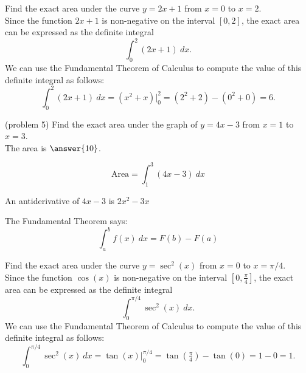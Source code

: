 \documentclass[handout]{ximera}
\begin{document}
\begin{example}[example 5]
Find the exact area under the curve $y = 2x+1$ from $x=0$ to $x= 2$.\\
Since the function $2x+1$ is non-negative on the interval $[0, 2]$, the exact area can be expressed as the definite integral
\[\int_0^2 (2x+1) \ dx.\]
We can use the Fundamental Theorem of Calculus to compute the value of this definite integral as follows:
\[
\int_0^2 (2x+ 1) \ dx = (x^2 + x) \Big|_0^2 = (2^2 + 2) - (0^2 + 0) = 6.
\]



\end{example}


\begin{problem}(problem 5)
Find the exact area under the graph of $y = 4x-3$ from $x = 1$ to $x = 3$.\\
The area is $\answer{10}$.
 \begin{hint}
  \[
  \text{Area} =  \int_1^3 (4x - 3) \ dx
  \]
 \end{hint}
    \begin{hint}
      An antiderivative of $4x-3$ is $2x^2 - 3x$
    \end{hint}
    \begin{hint}
      The Fundamental Theorem says:
      \[
      \int_a^b f(x) \ dx = F(b) - F(a)
      \]
    \end{hint}    
		
		
\end{problem}


\begin{example}[example 6]
Find the exact area under the curve $y = \sec^2(x)$ from $x=0$ to $x= \pi/4$.\\
Since the function $\cos(x)$ is non-negative on the interval $[0, \frac{\pi}{4}]$, the exact area can be 
expressed as the definite integral
\[\int_0^{\pi/4} \sec^2(x) \ dx.\]
We can use the Fundamental Theorem of Calculus to compute the value of this definite integral as follows:
\[
\int_0^{\pi/4} \sec^2(x) \ dx = \tan(x) \Big|_0^{\pi/4} = \tan(\tfrac{\pi}{4}) - \tan(0) = 1-0 =1.
\] 


\begin{image}
\end{image}




\end{example}
\end{document}
